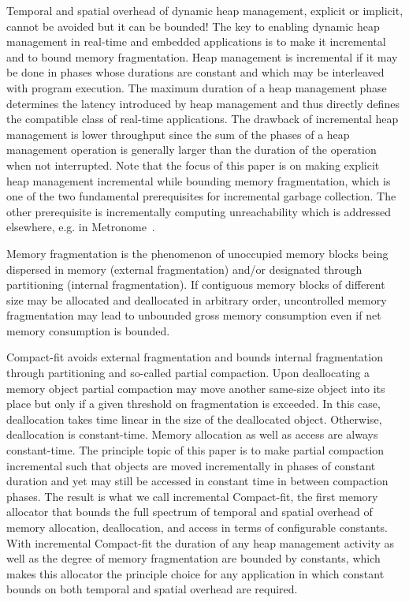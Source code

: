 \documentclass{amsart}
\begin{document}
Temporal and spatial overhead of dynamic heap management, explicit or
implicit, cannot be avoided but it can be bounded!  The key to
enabling dynamic heap management in real-time and embedded
applications is to make it incremental and to bound memory
fragmentation.  Heap management is incremental if it may be done in
phases whose durations are constant and which may be interleaved with
program execution.  The maximum duration of a heap management phase
determines the latency introduced by heap management and thus directly
defines the compatible class of real-time applications.  The drawback
of incremental heap management is lower throughput since the sum of
the phases of a heap management operation is generally larger than the
duration of the operation when not interrupted.  Note that the focus
of this paper is on making explicit heap management incremental while
bounding memory fragmentation, which is one of the two fundamental
prerequisites for incremental garbage collection.  The other
prerequisite is incrementally computing unreachability which is
addressed elsewhere, e.g. in Metronome~\cite{Bac2}.

Memory fragmentation is the phenomenon of unoccupied memory blocks
being dispersed in memory (external fragmentation) and/or designated
through partitioning (internal fragmentation).  If contiguous memory
blocks of different size may be allocated and deallocated in arbitrary
order, uncontrolled memory fragmentation may lead to unbounded gross
memory consumption even if net memory consumption is bounded.

Compact-fit avoids external fragmentation and bounds internal
fragmentation through partitioning and so-called partial compaction.
Upon deallocating a memory object partial compaction may move another
same-size object into its place but only if a given threshold on
fragmentation is exceeded.  In this case, deallocation takes time
linear in the size of the deallocated object.  Otherwise, deallocation
is constant-time.  Memory allocation as well as access are always
constant-time.  The principle topic of this paper is to make partial
compaction incremental such that objects are moved incrementally in
phases of constant duration and yet may still be accessed in constant
time in between compaction phases.  The result is what we call
incremental Compact-fit, the first memory allocator that bounds the
full spectrum of temporal and spatial overhead of memory allocation,
deallocation, and access in terms of configurable constants.  With
incremental Compact-fit the duration of any heap management activity
as well as the degree of memory fragmentation are bounded by
constants, which makes this allocator the principle choice for any
application in which constant bounds on both temporal and spatial
overhead are required.
\end{document}
